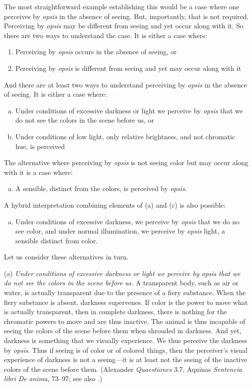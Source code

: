 The most straightforward example establishing this would be a case where one perceives by \emph{opsis} in the absence of seeing. But, importantly, that is not required. Perceiving by \emph{opsis} may be different from seeing and yet occur along with it. So there are two ways to understand the case. It is either a case where:
\begin{enumerate}[(1)]
	\item Perceiving by \emph{opsis} occurs in the absence of seeing, or
	\item Perceiving by \emph{opsis} is different from seeing and yet may occur along with it
\end{enumerate}
And there are at least two ways to understand perceiving by \emph{opsis} in the absence of seeing. It is either a case where:
\begin{enumerate}[(a)]
	\item Under conditions of excessive darkness or light we perceive by \emph{opsis} that we do not see the colors in the scene before us, or
	\item Under conditions of low light, only relative brightness, and not chromatic hue, is perceived
\end{enumerate}
The alternative where perceiving by \emph{opsis} is not seeing color but may occur along with it is a case where:
\begin{enumerate}[(c)]
	\item A sensible, distinct from the colors, is perceived by \emph{opsis}.
\end{enumerate}
A hybrid interpretation combining elements of (a) and (c) is also possible:
\begin{enumerate}[(d)]
	\item Under conditions of excessive darkness, we perceive by \emph{opsis} that we do no see color, and under normal illumination, we perceive by \emph{opsis} light, a sensible distinct from color.
\end{enumerate}
Let us consider these alternatives in turn.

(a) \emph{Under conditions of excessive darkness or light we perceive by \emph{opsis} that we do not see the colors in the scene before us.} A transparent body, such as air or water, is actually transparent due to the presence of a fiery substance. When the fiery substance is absent, darkness supervenes. If color is the power to move what is actually transparent, then in complete darkness, there is nothing for the chromatic powers to move and are thus inactive. The animal is thus incapable of seeing the colors of the scene before them when shrouded in darkness. And yet, darkness is something that we visually experience. We thus perceive the darkness by \emph{opsis}. Thus if seeing is of color or of colored things, then the perceiver's visual experience of darkness is not a seeing—it is at least not the seeing of the inactive colors of the scene before them. (Alexander \emph{Quaestiones} 3.7, Aquinas \emph{Sentencia libri De anima}, 73–97; see also \citealt[402]{Osborne:1983le}.)

